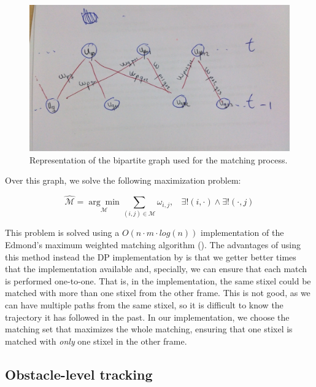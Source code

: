\begin{figure}[h!]
\centering
\includegraphics{bipartite_graph}
\caption{Representation of the bipartite graph used for the matching process.}\label{fig:cp04_bipartite_graph}
\end{figure}

Over this graph, we solve the following maximization problem:

\begin{equation}\label{eq:cp04_match_minimization}
\mathcal{\hat{M}}=\underset{\mathcal{M}}{\arg\min} \underset{(i, j) \in \mathcal{M}}{\sum} \omega_{i,j}, 
~~~~\exists! (i, \cdot) \wedge \exists! (\cdot, j)
\end{equation}

This problem is solved using a $O(n \cdot m \cdot log(n))$ implementation of the Edmond's maximum weighted matching algorithm (\cite{edmonds1965paths}). The advantages of using this method instead the \ac{DP} implementation by \cite{gunyel2012stixels} is that we getter better times that the implementation available and, specially, we can ensure that each match is performed one-to-one. That is, in the \cite{gunyel2012stixels} implementation, the same stixel could be matched with more than one stixel from the other frame. This is not good, as we can have multiple paths from the same stixel, so it is difficult to know the trajectory it has followed in the past. In our implementation, we choose the matching set that maximizes the whole matching, ensuring that one stixel is matched with \emph{only} one stixel in the other frame.

\subsection{Obstacle-level tracking}\label{ch:chapter04_01_04}

